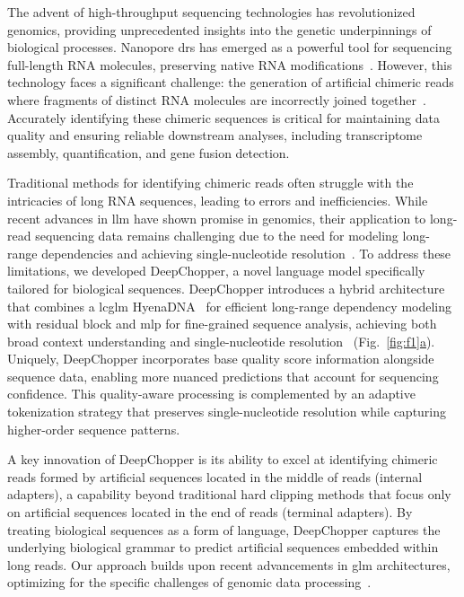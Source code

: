 \documentclass[pdflatex, sn-mathphys-num, lineno]{sn-jnl}%
\newcommand{\figref}[2]{Fig.~\hyperref[#1]{\ref*{#1}#2}}
\theoremstyle{thmstyleone}%
\theoremstyle{thmstyletwo}%
\theoremstyle{thmstylethree}%
\begin{document}
The advent of high-throughput sequencing technologies has revolutionized genomics, providing unprecedented insights into the genetic underpinnings of biological processes.
Nanopore \gls{drs} has emerged as a powerful tool for sequencing full-length RNA molecules, preserving native RNA modifications~\cite{ozsolak2009direct, garalde2018highly, jain2022advances}.
However, this technology faces a significant challenge: the generation of artificial chimeric reads where fragments of distinct RNA molecules are incorrectly joined together~\cite{smith2020molecular}.
Accurately identifying these chimeric sequences is critical for maintaining data quality and ensuring reliable downstream analyses, including transcriptome assembly, quantification, and gene fusion detection.

Traditional methods for identifying chimeric reads often struggle with the intricacies of long RNA sequences, leading to errors and inefficiencies.
While recent advances in \gls{llm} have shown promise in genomics, their application to long-read sequencing data remains challenging due to the need for modeling long-range dependencies and achieving single-nucleotide resolution~\cite{dalla2023nucleotide, tay2022efficient, zhou2023dnabert2}.
To address these limitations, we developed DeepChopper, a novel language model specifically tailored for biological sequences.
DeepChopper introduces a hybrid architecture that combines a \gls{lcglm} HyenaDNA~\cite{nguyen2024hyenadna} for efficient long-range dependency modeling with residual block and \gls{mlp} for fine-grained sequence analysis, achieving both broad context understanding and single-nucleotide resolution~\cite{poli2023hyena, he2016deep} (\figref{fig:f1}{a}).
Uniquely, DeepChopper incorporates base quality score information alongside sequence data, enabling more nuanced predictions that account for sequencing confidence.
This quality-aware processing is complemented by an adaptive tokenization strategy that preserves single-nucleotide resolution while capturing higher-order sequence patterns.

A key innovation of DeepChopper is its ability to excel at identifying chimeric reads formed by artificial sequences located in the middle of reads (internal adapters), a capability beyond traditional hard clipping methods that focus only on artificial sequences located in the end of reads (terminal adapters).
By treating biological sequences as a form of language, DeepChopper captures the underlying biological grammar to predict artificial sequences embedded within long reads.
Our approach builds upon recent advancements in \gls{glm} architectures, optimizing for the specific challenges of genomic data processing~\cite{nguyen2024hyenadna}.
\end{document}

